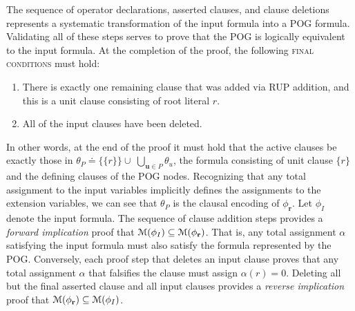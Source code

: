 \documentclass[letterpaper,USenglish,cleveref, autoref, thm-restate]{lipics-v2021}
\newcommand{\assign}{\alpha}
\newcommand{\modelset}{{\cal M}}
\newcommand{\inputformula}{\phi_I}
\newcommand{\pogformula}{\theta_P}
\newcommand{\makenode}[1]{\mathbf{#1}}
\newcommand{\nodeu}{\makenode{u}}
\newcommand{\noder}{\makenode{r}}
\begin{document}

The sequence of operator declarations, asserted clauses, and
clause deletions represents a systematic transformation of the input formula
into a POG formula.  Validating all of these steps serves to prove that the
POG is logically equivalent to the input formula.
At the completion of the proof, the following \textsc{final conditions} must hold:
\begin{enumerate}
\item There is exactly one remaining clause that was added via RUP
  addition, and this is a unit clause consisting of root literal $r$.
\item All of the input clauses have been deleted.
\end{enumerate}
In other words, at the end of the proof it must hold that the active clauses be exactly those
in $\pogformula \doteq \{\{r\}\} \cup \; \bigcup_{\nodeu \in P} \theta_{u}$, the formula consisting
of unit clause $\{r\}$ and the defining clauses of the POG nodes. Recognizing that
any total assignment to the input variables implicitly defines the assignments to the extension variables,
we can see that $\pogformula$ is the clausal encoding of $\phi_\noder$.
Let $\inputformula$ denote the input formula.
The sequence of clause addition steps provides a {\em forward implication} proof that
$\modelset(\inputformula) \subseteq \modelset(\phi_\noder)$.  That is, any total
assignment $\assign$ satisfying the input formula must also satisfy
the formula represented by the POG\@.
Conversely,
each proof step that deletes an input clause proves that any
total assignment $\alpha$ that falsifies the clause must
assign $\assign(r) = 0$.  Deleting all but the final asserted clause and all input clauses provides a {\em reverse implication} proof
that
$\modelset(\phi_\noder) \subseteq \modelset(\inputformula)$.
\end{document}
